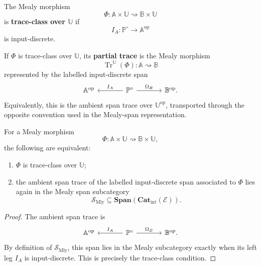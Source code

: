 \begin{definition}
\label{def:trace-class-mealy}
The Mealy morphism
\[
\Phi:
\mathbb A\times\mathbb U
\rightsquigarrow
\mathbb B\times\mathbb U
\]
is \textbf{trace-class over \(\mathbb U\)} if
\[
I_A:\mathbb P^\circ\to\mathbb A^{\mathrm{op}}
\]
is input-discrete.
\end{definition}

\begin{definition}
\label{def:partial-trace-mealy}
If \(\Phi\) is trace-class over \(\mathbb U\), its \textbf{partial trace} is the
Mealy morphism
\[
\operatorname{Tr}^{\mathbb U}(\Phi):
\mathbb A\rightsquigarrow\mathbb B
\]
represented by the labelled input-discrete span
\[
\begin{tikzcd}[column sep=large]
\mathbb A^{\mathrm{op}}
&
\mathbb P^\circ
  \arrow[l, "I_A"']
  \arrow[r, "\Omega_B"]
&
\mathbb B^{\mathrm{op}} .
\end{tikzcd}
\]
Equivalently, this is the ambient span trace over
\(\mathbb U^{\mathrm{op}}\), transported through the opposite convention used
in the Mealy-span representation.
\end{definition}

\begin{proposition}
\label{prop:trace-class-ambient-closure}
For a Mealy morphism
\[
\Phi:
\mathbb A\times\mathbb U
\rightsquigarrow
\mathbb B\times\mathbb U,
\]
the following are equivalent:
\begin{enumerate}
\item \(\Phi\) is trace-class over \(\mathbb U\);
\item the ambient span trace of the labelled input-discrete span associated to
\(\Phi\) lies again in the Mealy span subcategory
\[
\mathcal S_{\mathrm{Mly}}
\subseteq
\mathbf{Span}(\mathbf{Cat}_{\mathrm{int}}(\mathcal E)).
\]
\end{enumerate}
\end{proposition}

\begin{proof}
The ambient span trace is
\[
\begin{tikzcd}[column sep=large]
\mathbb A^{\mathrm{op}}
&
\mathbb P^\circ
  \arrow[l, "I_A"']
  \arrow[r, "\Omega_B"]
&
\mathbb B^{\mathrm{op}} .
\end{tikzcd}
\]
By definition of \(\mathcal S_{\mathrm{Mly}}\), this span lies in the Mealy
subcategory exactly when its left leg \(I_A\) is input-discrete.  This is
precisely the trace-class condition.
\end{proof}

